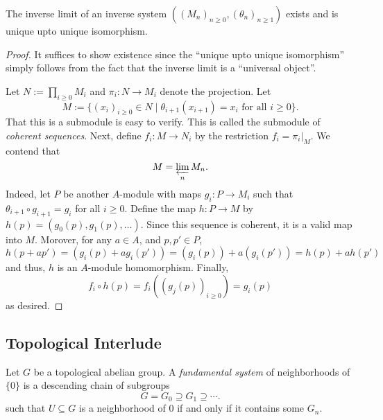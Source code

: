 \begin{proposition}
    The inverse limit of an inverse system $((M_n)_{n\ge 0}, (\theta_n)_{n\ge1})$ exists and is unique upto unique isomorphism.
\end{proposition}
\begin{proof}
    It suffices to show existence since the ``unique upto unique isomorphism'' simply follows from the fact that the inverse limit is a ``universal object''.

    Let $N := \prod_{i\ge 0} M_i$ and $\pi_i: N\to M_i$ denote the projection. Let 
    \begin{equation*}
        M := \{(x_i)_{i\ge 0}\in N\mid \theta_{i + 1}(x_{i + 1}) = x_i\text{ for all }i\ge 0\}.
    \end{equation*}
    That this is a submodule is easy to verify. This is called the submodule of \emph{coherent sequences}. Next, define $f_i: M\to N_i$ by the restriction $f_i = \pi_i|_M$. We contend that 
    \begin{equation*}
        M = \varprojlim_n M_n.
    \end{equation*}
    Indeed, let $P$ be another $A$-module with maps $g_i: P\to M_i$ such that $\theta_{i + 1}\circ g_{i + 1} = g_{i}$ for all $i\ge 0$. Define the map $h: P\to M$ by $h(p) = (g_0(p),g_1(p),\dots)$. Since this sequence is coherent, it is a valid map into $M$. Morover, for any $a\in A$, and $p,p'\in P$,
    \begin{equation*}
        h(p + ap') = (g_i(p) + ag_i(p')) = (g_i(p)) + a(g_i(p')) = h(p) + ah(p')
    \end{equation*}
    and thus, $h$ is an $A$-module homomorphism. Finally, 
    \begin{equation*}
        f_i\circ h(p) = f_i((g_j(p))_{i\ge 0}) = g_i(p)
    \end{equation*}
    as desired.
\end{proof}

\subsection*{Topological Interlude}

\begin{definition}
    Let $G$ be a topological abelian group. A \emph{fundamental system} of neighborhoods of $\{0\}$ is a descending chain of subgroups 
    \begin{equation*}
        G = G_0\supseteq G_1\supseteq\cdots.
    \end{equation*}
    such that $U\subseteq G$ is a neighborhood of $0$ if and only if it contains some $G_n$.
\end{definition}

